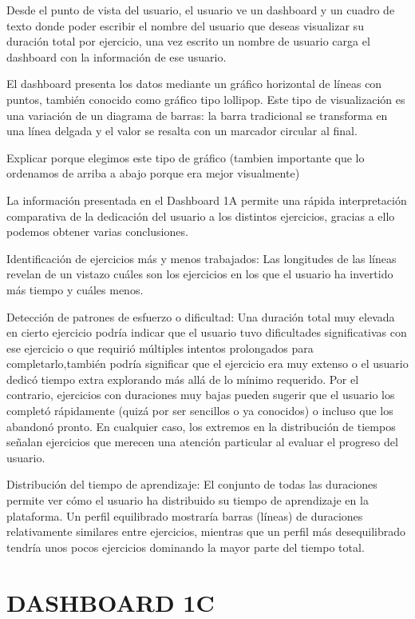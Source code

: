 \documentclass[a4paper, 12pt]{book}
\begin{document}
Desde el punto de vista del usuario, el usuario ve un dashboard y un cuadro de texto donde poder escribir el nombre del usuario que deseas visualizar su duración total por ejercicio, una vez escrito un nombre de usuario carga el dashboard con la información de ese usuario.

El dashboard presenta los datos mediante un gráfico horizontal de líneas con puntos, también conocido como gráfico tipo lollipop. Este tipo de visualización es una variación de un diagrama de barras: la barra tradicional se transforma en una línea delgada y el valor se resalta con un marcador circular al final.

Explicar porque elegimos este tipo de gráfico (tambien importante que lo ordenamos de arriba a abajo porque era mejor visualmente)

La información presentada en el Dashboard 1A permite una rápida interpretación comparativa de la dedicación del usuario a los distintos ejercicios, gracias a ello podemos obtener varias conclusiones.

Identificación de ejercicios más y menos trabajados: Las longitudes de las líneas revelan de un vistazo cuáles son los ejercicios en los que el usuario ha invertido más tiempo y cuáles menos.

Detección de patrones de esfuerzo o dificultad: Una duración total muy elevada en cierto ejercicio podría indicar que el usuario tuvo dificultades significativas con ese ejercicio o que requirió múltiples intentos prolongados para completarlo,también podría significar que el ejercicio era muy extenso o el usuario dedicó tiempo extra explorando más allá de lo mínimo requerido. Por el contrario, ejercicios con duraciones muy bajas pueden sugerir que el usuario los completó rápidamente (quizá por ser sencillos o ya conocidos) o incluso que los abandonó pronto. En cualquier caso, los extremos en la distribución de tiempos señalan ejercicios que merecen una atención particular al evaluar el progreso del usuario.

Distribución del tiempo de aprendizaje: El conjunto de todas las duraciones permite ver cómo el usuario ha distribuido su tiempo de aprendizaje en la plataforma. Un perfil equilibrado mostraría barras (líneas) de duraciones relativamente similares entre ejercicios, mientras que un perfil más desequilibrado tendría unos pocos ejercicios dominando la mayor parte del tiempo total.

\section{DASHBOARD 1C}
\end{document}
